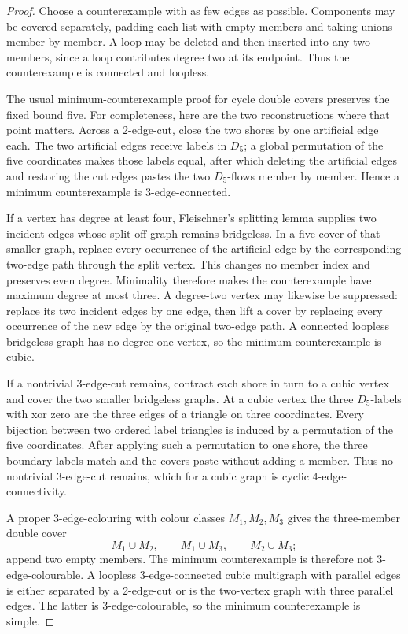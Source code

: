 \documentclass[11pt]{article}
\theoremstyle{definition}
\theoremstyle{remark}
\begin{document}
\begin{proof}
Choose a counterexample with as few edges as possible.  Components may
be covered separately, padding each list with empty members and taking
unions member by member.  A loop may be deleted and then inserted into
any two members, since a loop contributes degree two at its endpoint.
Thus the counterexample is connected and loopless.

The usual minimum-counterexample proof for cycle double covers
\cite{Zhang2012} preserves the fixed bound five.  For completeness, here
are the two reconstructions where that point matters.  Across a
2-edge-cut, close the two shores by one artificial edge each.  The two
artificial edges receive labels in \(D_5\); a global permutation of the
five coordinates makes those labels equal, after which deleting the
artificial edges and restoring the cut edges pastes the two
\(D_5\)-flows member by member.  Hence a minimum counterexample is
3-edge-connected.

If a vertex has degree at least four, Fleischner's splitting lemma
\cite[Lemma~III.26]{Fleischner1990} supplies two incident edges whose
split-off graph remains bridgeless.  In a five-cover of that smaller
graph, replace every occurrence of the artificial edge by the
corresponding two-edge path through the split vertex.  This changes no
member index and preserves even degree.  Minimality therefore makes the
counterexample have maximum degree at most three.  A degree-two vertex
may likewise be suppressed: replace its two incident edges by one edge,
then lift a cover by replacing every occurrence of the new edge by the
original two-edge path.  A connected loopless bridgeless graph has no
degree-one vertex, so the minimum counterexample is cubic.

If a nontrivial 3-edge-cut remains, contract each shore in turn to a
cubic vertex and cover the two smaller bridgeless graphs.  At a cubic
vertex the three \(D_5\)-labels with xor zero are the three edges of a
triangle on three coordinates.  Every bijection between two ordered
label triangles is induced by a permutation of the five coordinates.
After applying such a permutation to one shore, the three boundary
labels match and the covers paste without adding a member.  Thus no
nontrivial 3-edge-cut remains, which for a cubic graph is cyclic
\(4\)-edge-connectivity.

A proper 3-edge-colouring with colour classes \(M_1,M_2,M_3\) gives the
three-member double cover
\[
 M_1\cup M_2,\qquad M_1\cup M_3,\qquad M_2\cup M_3;
\]
append two empty members.  The minimum counterexample is therefore not
3-edge-colourable.  A loopless 3-edge-connected cubic multigraph with
parallel edges is either separated by a 2-edge-cut or is the two-vertex
graph with three parallel edges.  The latter is 3-edge-colourable, so
the minimum counterexample is simple.
\end{proof}
\end{document}
